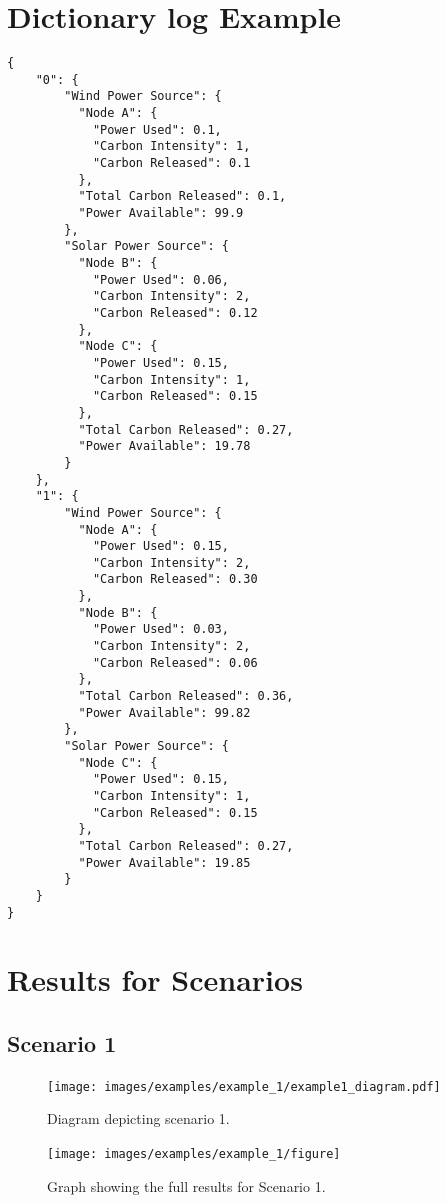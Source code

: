 \documentclass{l4proj}
\begin{document}
\section{Dictionary log Example}
\begin{lstlisting}[caption={Example dictionary structure used by the power domain.},label={lst:dic-log}]
{
    "0": {
        "Wind Power Source": {
          "Node A": {
            "Power Used": 0.1,
            "Carbon Intensity": 1,
            "Carbon Released": 0.1
          },
          "Total Carbon Released": 0.1,
          "Power Available": 99.9
        },
        "Solar Power Source": {
          "Node B": {
            "Power Used": 0.06,
            "Carbon Intensity": 2,
            "Carbon Released": 0.12
          },
          "Node C": {
            "Power Used": 0.15,
            "Carbon Intensity": 1,
            "Carbon Released": 0.15
          },
          "Total Carbon Released": 0.27,
          "Power Available": 19.78
        }
    },
    "1": {
        "Wind Power Source": {
          "Node A": {
            "Power Used": 0.15,
            "Carbon Intensity": 2,
            "Carbon Released": 0.30
          },
          "Node B": {
            "Power Used": 0.03,
            "Carbon Intensity": 2,
            "Carbon Released": 0.06
          },
          "Total Carbon Released": 0.36,
          "Power Available": 99.82
        },
        "Solar Power Source": {
          "Node C": {
            "Power Used": 0.15,
            "Carbon Intensity": 1,
            "Carbon Released": 0.15
          },
          "Total Carbon Released": 0.27,
          "Power Available": 19.85
        }
    }
}
\end{lstlisting}
\clearpage
\section{Results for Scenarios}\label{apen:subsec:scen1}
\subsection{Scenario 1}\label{apen:scen1}
\begin{figure}[h]
    \centering
    \texttt{[image: images/examples/example\_1/example1\_diagram.pdf]}
    ~
    \caption{Diagram depicting scenario 1.}
    \label{fig:example1_diagram}
\end{figure}
\clearpage
\begin{figure}[htbp]
    \centering
    \texttt{[image: images/examples/example\_1/figure]}
    ~
    \caption{Graph showing the full results for Scenario 1.}
    \label{fig:example1}
\end{figure}
\end{document}
